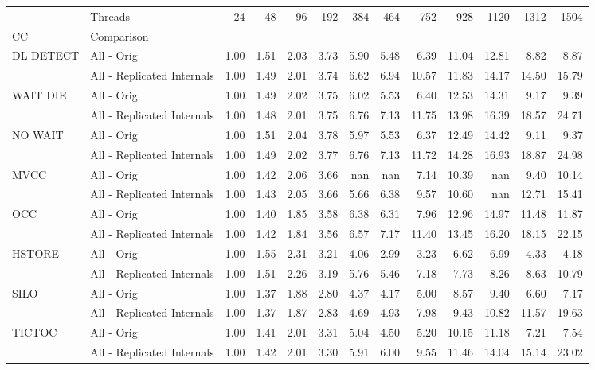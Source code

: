 \begin{tabular}{llrrrrrrrrrrr}
\toprule
       & Threads &  24   &  48   &  96   &  192  &  384  &  464  &  752  &  928  &  1120 &  1312 &  1504 \\
CC & Comparison &       &       &       &       &       &       &       &       &       &       &       \\
\midrule
DL DETECT & All - Orig &  1.00 &  1.51 &  2.03 &  3.73 &  5.90 &  5.48 &  6.39 & 11.04 & 12.81 &  8.82 &  8.87 \\
       & All - Replicated Internals &  1.00 &  1.49 &  2.01 &  3.74 &  6.62 &  6.94 & 10.57 & 11.83 & 14.17 & 14.50 & 15.79 \\
WAIT DIE & All - Orig &  1.00 &  1.49 &  2.02 &  3.75 &  6.02 &  5.53 &  6.40 & 12.53 & 14.31 &  9.17 &  9.39 \\
       & All - Replicated Internals &  1.00 &  1.48 &  2.01 &  3.75 &  6.76 &  7.13 & 11.75 & 13.98 & 16.39 & 18.57 & 24.71 \\
NO WAIT & All - Orig &  1.00 &  1.51 &  2.04 &  3.78 &  5.97 &  5.53 &  6.37 & 12.49 & 14.42 &  9.11 &  9.37 \\
       & All - Replicated Internals &  1.00 &  1.49 &  2.02 &  3.77 &  6.76 &  7.13 & 11.72 & 14.28 & 16.93 & 18.87 & 24.98 \\
MVCC & All - Orig &  1.00 &  1.42 &  2.06 &  3.66 &   nan &   nan &  7.14 & 10.39 &   nan &  9.40 & 10.14 \\
       & All - Replicated Internals &  1.00 &  1.43 &  2.05 &  3.66 &  5.66 &  6.38 &  9.57 & 10.60 &   nan & 12.71 & 15.41 \\
OCC & All - Orig &  1.00 &  1.40 &  1.85 &  3.58 &  6.38 &  6.31 &  7.96 & 12.96 & 14.97 & 11.48 & 11.87 \\
       & All - Replicated Internals &  1.00 &  1.42 &  1.84 &  3.56 &  6.57 &  7.17 & 11.40 & 13.45 & 16.20 & 18.15 & 22.15 \\
HSTORE & All - Orig &  1.00 &  1.55 &  2.31 &  3.21 &  4.06 &  2.99 &  3.23 &  6.62 &  6.99 &  4.33 &  4.18 \\
       & All - Replicated Internals &  1.00 &  1.51 &  2.26 &  3.19 &  5.76 &  5.46 &  7.18 &  7.73 &  8.26 &  8.63 & 10.79 \\
SILO & All - Orig &  1.00 &  1.37 &  1.88 &  2.80 &  4.37 &  4.17 &  5.00 &  8.57 &  9.40 &  6.60 &  7.17 \\
       & All - Replicated Internals &  1.00 &  1.37 &  1.87 &  2.83 &  4.69 &  4.93 &  7.98 &  9.43 & 10.82 & 11.57 & 19.63 \\
TICTOC & All - Orig &  1.00 &  1.41 &  2.01 &  3.31 &  5.04 &  4.50 &  5.20 & 10.15 & 11.18 &  7.21 &  7.54 \\
       & All - Replicated Internals &  1.00 &  1.42 &  2.01 &  3.30 &  5.91 &  6.00 &  9.55 & 11.46 & 14.04 & 15.14 & 23.02 \\
\bottomrule
\end{tabular}
